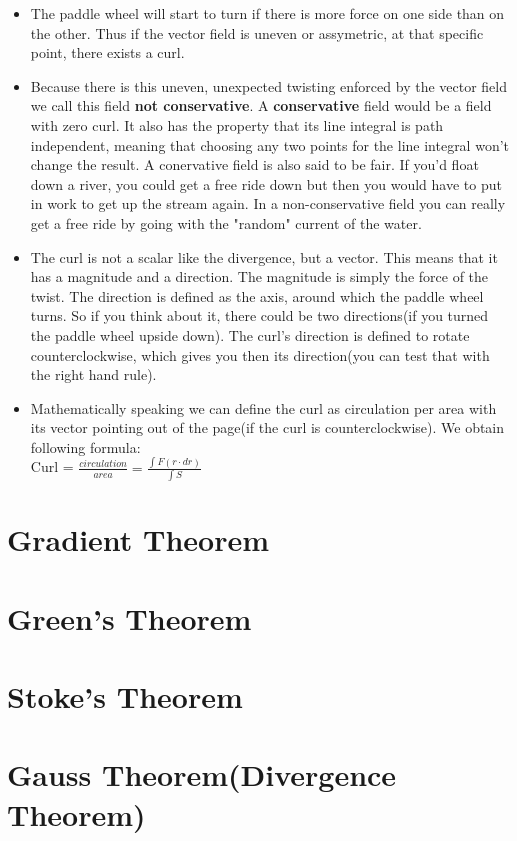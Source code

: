 \documentclass[12pt,a4paper]{article}
\begin{document}
\begin{itemize}
		\item The paddle wheel will start to turn if there is more force on one side than on the other. Thus if the vector field is uneven or assymetric, at that specific point, there exists a curl. 
		\item Because there is this uneven, unexpected twisting enforced by the vector field we call this field \textbf{not conservative}. A \textbf{conservative} field would be a field with zero curl. It also has the property that its line integral is path independent, meaning that choosing any two points for the line integral won't change the result. A conervative field is also said to be fair. If you'd float down a river, you could get a free ride down but then you would have to put in work to get up the stream again. In a non-conservative field you can really get a free ride by going with the "random" current of the water. 
		\item The curl is not a scalar like the divergence, but a vector. This means that it has a magnitude and a direction. The magnitude is simply the force of the twist. The direction is defined as the axis, around which the paddle wheel turns. So if you think about it, there could be two directions(if you turned the paddle wheel upside down). The curl's direction is defined to rotate counterclockwise, which gives you then its direction(you can test that with the right hand rule).
		
		\item Mathematically speaking we can define the curl as circulation per area with its vector pointing out of the page(if the curl is counterclockwise). We obtain following formula:\\
		Curl = $\frac{circulation}{area} = \frac{\int F(r \cdot dr)}{\int S}$
		
		 
	\end{itemize}
	
	\newpage
	
	\section{Gradient Theorem}
	
	\newpage
	
	\section{Green's Theorem}
	
	\newpage
	
	\section{Stoke's Theorem}
	
	\newpage
	
	\section{Gauss Theorem(Divergence Theorem)}
	
	
	

	
	
	

	
\end{document}
